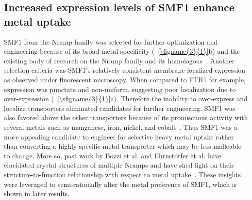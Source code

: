\documentclass[../main/main]{subfiles}
\begin{document}
\subsection{Increased expression levels of SMF1 enhance metal uptake}
SMF1 from the Nramp family was selected for further optimization and engineering because of its broad metal specificity (\FIGURE~\ref{\figname{3}{1}}b) and the existing body of research on the Nramp family and its homologous~\cite{bozzi2016,bozzi2016a,ehrnstorfer2017,courville2006}. Another selection criteria was SMF1's relatively consistent membrane-localized expression as observed under fluorescent microscopy. When compared to FTR1 for example, expression was punctate and non-uniform, suggesting poor localization due to over-expression (\sFIGURE~\ref{\sfigname{3}{1}}a). Therefore the inability to over-express and localize transporters eliminated candidates for further engineering.
SMF1 was also favored above the other transporters because of its promiscuous activity with several metals such as manganese, iron, nickel, and cobalt~\cite{anthonyvanho2002,courville2006,liu1997}. Thus SMF1 was a more appealing candidate to engineer for selective heavy metal uptake rather than converting a highly specific metal transporter which may be less malleable to change. More so, past work by Bozzi et al. and Ehrnstorfer et al. have elucidated crystal structures of multiple Nramps and have shed light on their structure-to-function relationship with respect to metal uptake~\cite{bozzi2016a,ehrnstorfer2014}. These insights were leveraged to semi-rationally alter the metal preference of SMF1, which is shown in later results.
\end{document}

